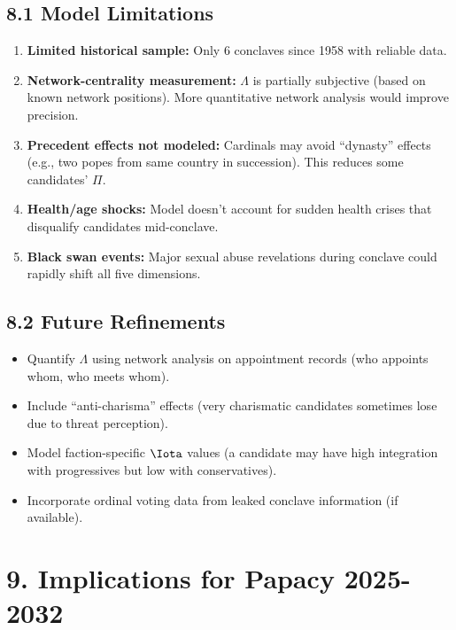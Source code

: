 \subsection{8.1 Model Limitations}

\begin{enumerate}
\item \textbf{Limited historical sample:} Only 6 conclaves since 1958 with reliable data.

\item \textbf{Network-centrality measurement:} $\Lambda$ is partially subjective (based on known network positions). More quantitative network analysis would improve precision.

\item \textbf{Precedent effects not modeled:} Cardinals may avoid ``dynasty'' effects (e.g., two popes from same country in succession). This reduces some candidates' $\Pi$.

\item \textbf{Health/age shocks:} Model doesn't account for sudden health crises that disqualify candidates mid-conclave.

\item \textbf{Black swan events:} Major sexual abuse revelations during conclave could rapidly shift all five dimensions.
\end{enumerate}

\subsection{8.2 Future Refinements}

\begin{itemize}
\item Quantify $\Lambda$ using network analysis on appointment records (who appoints whom, who meets whom).
\item Include ``anti-charisma'' effects (very charismatic candidates sometimes lose due to threat perception).
\item Model faction-specific $\Iota$ values (a candidate may have high integration with progressives but low with conservatives).
\item Incorporate ordinal voting data from leaked conclave information (if available).
\end{itemize}

\section{9. Implications for Papacy 2025-2032}

